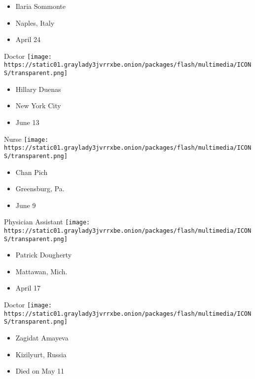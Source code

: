 \begin{itemize}
\tightlist
\item
  Ilaria Sommonte
\item
  Naples, Italy
\item
  April 24
\end{itemize}

\protect\hyperlink{item-hillary-duenas}{}

Doctor
\texttt{[image: https://static01.graylady3jvrrxbe.onion/packages/flash/multimedia/ICONS/transparent.png]}

\begin{itemize}
\tightlist
\item
  Hillary Duenas
\item
  New York City
\item
  June 13
\end{itemize}

\protect\hyperlink{item-chan-pich}{}

Nurse
\texttt{[image: https://static01.graylady3jvrrxbe.onion/packages/flash/multimedia/ICONS/transparent.png]}

\begin{itemize}
\tightlist
\item
  Chan Pich
\item
  Greensburg, Pa.
\item
  June 9
\end{itemize}

\protect\hyperlink{item-patrick-dougherty}{}

Physician Assistant
\texttt{[image: https://static01.graylady3jvrrxbe.onion/packages/flash/multimedia/ICONS/transparent.png]}

\begin{itemize}
\tightlist
\item
  Patrick Dougherty
\item
  Mattawan, Mich.
\item
  April 17
\end{itemize}

\protect\hyperlink{item-zagidat-amayeva}{}

Doctor
\texttt{[image: https://static01.graylady3jvrrxbe.onion/packages/flash/multimedia/ICONS/transparent.png]}

\begin{itemize}
\tightlist
\item
  Zagidat Amayeva
\item
  Kizilyurt, Russia
\item
  Died on May 11
\end{itemize}

